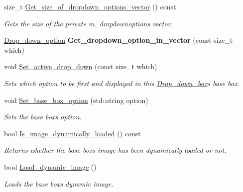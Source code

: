 \begin{DoxyCompactItemize}
size\+\_\+t \hyperlink{classjetfuel_1_1gui_1_1Drop__down__box_a72f957e19c3ce5f3da61ef3d47d09b2f}{Get\+\_\+size\+\_\+of\+\_\+dropdown\+\_\+options\+\_\+vector} () const
\begin{DoxyCompactList}\small\item\em Gets the size of the private m\+\_\+dropdownoptions vector. \end{DoxyCompactList}\item 
\mbox{\label{classjetfuel_1_1gui_1_1Drop__down__box_af6ac565eb238a27b8c988143c82cafe4}} 
\hyperlink{structjetfuel_1_1gui_1_1Drop__down__box_1_1Drop__down__option}{Drop\+\_\+down\+\_\+option} {\bfseries Get\+\_\+dropdown\+\_\+option\+\_\+in\+\_\+vector} (const size\+\_\+t which)
\item 
void \hyperlink{classjetfuel_1_1gui_1_1Drop__down__box_af9d4d77418cc67a85dc98519224458f4}{Set\+\_\+active\+\_\+drop\+\_\+down} (const size\+\_\+t which)
\begin{DoxyCompactList}\small\item\em Sets which option to be first and displayed in this \hyperlink{classjetfuel_1_1gui_1_1Drop__down__box}{Drop\+\_\+down\+\_\+box}\textquotesingle{}s base box. \end{DoxyCompactList}\item 
void \hyperlink{classjetfuel_1_1gui_1_1Drop__down__box_a2fac141eb75af5c59b208753634f2e75}{Set\+\_\+base\+\_\+box\+\_\+option} (std\+::string option)
\begin{DoxyCompactList}\small\item\em Sets the base box\textquotesingle{}s option. \end{DoxyCompactList}\item 
bool \hyperlink{classjetfuel_1_1gui_1_1Drop__down__box_a66969f93183947614501055bc9e73510}{Is\+\_\+image\+\_\+dynamically\+\_\+loaded} () const
\begin{DoxyCompactList}\small\item\em Returns whether the base box\textquotesingle{}s image has been dynamically loaded or not. \end{DoxyCompactList}\item 
bool \hyperlink{classjetfuel_1_1gui_1_1Drop__down__box_a115a8142c37ed537d765302fcbf7d3fd}{Load\+\_\+dynamic\+\_\+image} ()
\begin{DoxyCompactList}\small\item\em Loads the base box\textquotesingle{}s dynamic image. \end{DoxyCompactList}\item 

\end{DoxyCompactItemize}
